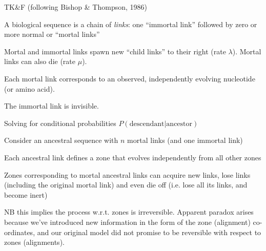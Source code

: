 \documentclass{beamer}
\begin{document}
\begin{frame}{}
\itemb
\item TK\&F %
 (following Bishop \& Thompson, 1986)
 \itemb
 \item A biological sequence is a chain of {\em links}: one ``immortal link'' followed by zero or more normal or ``mortal links''
 \item Mortal and immortal links spawn new ``child links'' to their right (rate $\lambda$). Mortal links can also die (rate $\mu$).
 \item Each mortal link corresponds to an observed, independently evolving nucleotide (or amino acid).
 \item The immortal link is invisible.
 \iteme
\iteme
\end{frame}

\begin{frame}{}
\small
{}
\normalsize
\end{frame}

\begin{frame}{}

Solving for conditional probabilities $P(\mbox{descendant}|\mbox{ancestor})$ %
 \itemb
 \item Consider an ancestral sequence with $n$ mortal links (and one immortal link)
 \item Each ancestral link defines a zone that evolves independently from all other zones
 \item Zones corresponding to mortal ancestral links can acquire new links, lose links (including the original mortal link) and even die off
(i.e. lose all its links, and become inert)
  \itemb
  \item NB this implies the process w.r.t. zones is irreversible. Apparent paradox arises because we've introduced new information
in the form of the zone (alignment) co-ordinates, and our original model did not promise to be reversible with respect to zones (alignments).
  \iteme
 \iteme
\end{frame}
\end{document}
